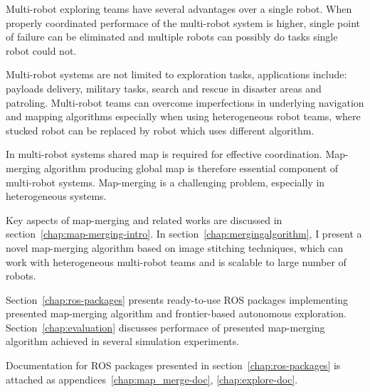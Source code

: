
Multi-robot exploring teams have several advantages over a single robot. When properly coordinated performace of the multi-robot system is higher, single point of failure can be eliminated and multiple robots can possibly do tasks single robot could not.

Multi-robot systems are not limited to exploration tasks, applications include: payloads delivery, military tasks, search and rescue in disaster areas and patroling. Multi-robot teams can overcome imperfections in underlying navigation and mapping algorithms especially when using heterogeneous robot teams, where stucked robot can be replaced by robot which uses different algorithm.

In multi-robot systems shared map is required for effective coordination. Map-merging algorithm producing global map is therefore essential component of multi-robot systems. Map-merging is a challenging problem, especially in heterogeneous systems.

Key aspects of map-merging and related works are discussed in section~\ref{chap:map-merging-intro}. In section~\ref{chap:mergingalgorithm}, I present a novel map-merging algorithm based on image stitching techniques, which can work with heterogeneous multi-robot teams and is scalable to large number of robots.

Section~\ref{chap:ros-packages} presents ready-to-use \gls{ROS} packages implementing presented map-merging algorithm and frontier-based autonomous exploration. Section~\ref{chap:evaluation} discusses performace of presented map-merging algorithm achieved in several simulation experiments.

Documentation for \gls{ROS} packages presented in section~\ref{chap:ros-packages} is attached as appendices~\ref{chap:map_merge-doc}, \ref{chap:explore-doc}.

